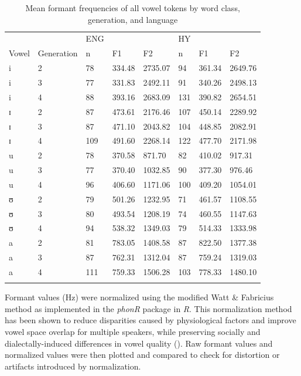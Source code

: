\documentclass[output=paper]{langsci/langscibook}
\begin{document}
\begin{table}
\begin{tabularx}{0.96\textwidth}{p{0.7cm}Xp{0.5cm}p{1.2cm}p{1.2cm}p{0.7cm}p{1.2cm}p{1.2cm}}
\lsptoprule
	& & ENG & & & HY & &\\
\cline{3-8}
{Vowel} & {Generation} & {n} & {F1} & {F2} & {n} & {F1} & {F2}\\
\hline
i & 2 & 78 & 334.48 & 2735.07 & 94 & 361.34 & 2649.76\\
i & 3 & 77 & 331.83 & 2492.11 & 91 & 340.26 & 2498.13\\
i & 4 & 88 & 393.16 & 2683.09 & 131 & 390.82 & 2654.51\\
ɪ & 2 & 87 & 473.61 & 2176.46 & 107 & 450.14 & 2289.92\\
ɪ & 3 & 87 & 471.10 & 2043.82 & 104 & 448.85 & 2082.91\\
ɪ & 4 & 109 & 491.60 & 2268.14 & 122 & 477.70 & 2171.98\\
u & 2 & 78 & 370.58 & 871.70 & 82 & 410.02 & 917.31\\
u & 3 & 77 & 370.40 & 1032.85 & 90 & 377.30 & 976.46\\
u & 4 & 96 & 406.60 & 1171.06 & 100 & 409.20 & 1054.01\\
ʊ & 2 & 79 & 501.26 & 1232.95 & 71 & 461.57 & 1108.55\\
ʊ & 3 & 80 & 493.54 & 1208.19 & 74 & 460.55 & 1147.63\\
ʊ & 4 & 94 & 538.32 & 1349.03 & 79 & 514.33 & 1333.98\\
a & 2 & 81 & 783.05 & 1408.58 & 87 & 822.50 & 1377.38\\
a & 3 & 87 & 762.31 & 1312.04 & 87 & 759.24 & 1319.03\\
a & 4 & 111 & 759.33 & 1506.28 & 103 & 778.33 & 1480.10\\
\lspbottomrule
\end{tabularx}
\caption{Mean formant frequencies of all vowel tokens by word class, generation, and language}\label{tab:nove:2}
\end{table}

Formant values (Hz) were normalized using the modified Watt \& Fabricius method as implemented in the \textit{phonR} package \citep{McCloy2016} in \textit{R}. This normalization method has been shown to reduce disparities caused by physiological factors and improve vowel space overlap for multiple speakers, while preserving socially and dialectally-induced differences in vowel quality (\citealt{WattFabricius2002, FabriciusEtAl2009}). Raw formant values and normalized values were then plotted and compared to check for distortion or artifacts introduced by normalization. 
\end{document}
